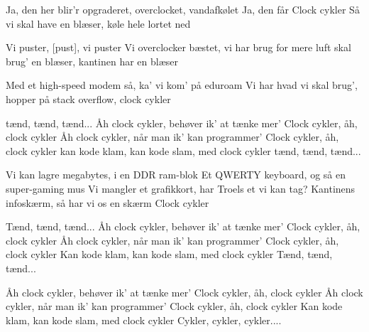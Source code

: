 \documentclass[a4paper,11pt]{article}
\begin{document}
\begin{song}

  Ja, den her blir'r opgraderet, overclocket, vandafkølet
  Ja, den får Clock cykler
  Så vi skal have en blæser, køle hele lortet ned

   Vi puster, [pust], vi puster
   Vi overclocker bæstet, vi har brug for mere luft
   skal brug' en blæser, kantinen har en blæser

  Med et high-speed modem så, ka' vi kom' på eduroam
  Vi har hvad vi skal brug', hopper på stack overflow, clock cykler

   tænd, tænd, tænd...
   Åh clock cykler, behøver ik' at tænke mer'
   Clock cykler, åh, clock cykler
   Åh clock cykler, når man ik' kan programmer'
   Clock cykler, åh, clock cykler
   kan kode klam, kan kode slam, med clock cykler
   tænd, tænd, tænd...

  Vi kan lagre megabytes, i en DDR ram-blok
  Et QWERTY keyboard, og så en super-gaming mus
  Vi mangler et grafikkort, har Troels et vi kan tag?
  Kantinens infoskærm, så har vi os en skærm
  Clock cykler

   Tænd, tænd, tænd...
  Åh clock cykler, behøver ik' at tænke mer'
   Clock cykler, åh, clock cykler
   Åh clock cykler, når man ik' kan programmer'
   Clock cykler, åh, clock cykler
   Kan kode klam, kan kode slam, med clock cykler
   Tænd, tænd, tænd...


  Åh clock cykler, behøver ik' at tænke mer'
   Clock cykler, åh, clock cykler
   Åh clock cykler, når man ik' kan programmer'
   Clock cykler, åh, clock cykler
   Kan kode klam, kan kode slam, med clock cykler
   Cykler, cykler, cykler....


  \end{song}
\end{document}
